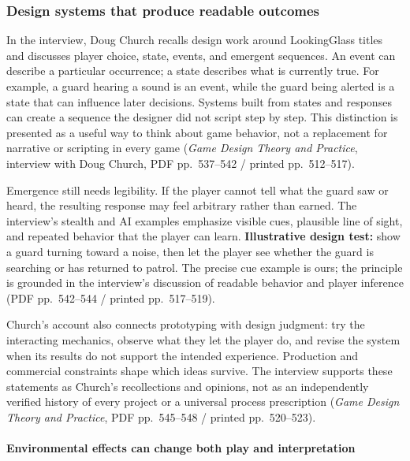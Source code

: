 \subsubsection{Design systems that produce readable outcomes}\label{05-engine-i-ch009-design-systems-that-produce-readable-outcomes}

In the interview, Doug Church recalls design work around LookingGlass titles and discusses player choice, state, events, and emergent sequences. An event can describe a particular occurrence; a state describes what is currently true. For example, a guard hearing a sound is an event, while the guard being alerted is a state that can influence later decisions. Systems built from states and responses can create a sequence the designer did not script step by step. This distinction is presented as a useful way to think about game behavior, not a replacement for narrative or scripting in every game (\emph{Game Design Theory and Practice}, interview with Doug Church, PDF pp.~537--542 / printed pp.~512--517).

Emergence still needs legibility. If the player cannot tell what the guard saw or heard, the resulting response may feel arbitrary rather than earned. The interview's stealth and AI examples emphasize visible cues, plausible line of sight, and repeated behavior that the player can learn. \textbf{Illustrative design test:} show a guard turning toward a noise, then let the player see whether the guard is searching or has returned to patrol. The precise cue example is ours; the principle is grounded in the interview's discussion of readable behavior and player inference (PDF pp.~542--544 / printed pp.~517--519).

Church's account also connects prototyping with design judgment: try the interacting mechanics, observe what they let the player do, and revise the system when its results do not support the intended experience. Production and commercial constraints shape which ideas survive. The interview supports these statements as Church's recollections and opinions, not as an independently verified history of every project or a universal process prescription (\emph{Game Design Theory and Practice}, PDF pp.~545--548 / printed pp.~520--523).

\paragraph{Environmental effects can change both play and interpretation}\label{05-engine-i-ch009-environmental-effects-can-change-both-play-and-interpretation}

